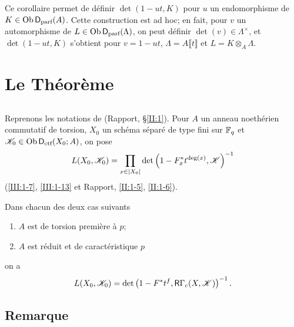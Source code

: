 Ce corollaire permet de définir $\det(1-u t,K)$ pour $u$ un endomorphisme de 
$K\in \operatorname{Ob}\mathsf{D}_\text{parf}(A)$. Cette construction est ad hoc; en fait, pour $v$ un 
automorphisme de $L\in\operatorname{Ob}\mathsf{D}_\text{parf}(\Lambda)$, on peut définir 
$\det(v)\in\Lambda^\times$, et $\det(1-u t,K)$ s'obtient pour $v=1-u t$, 
$\Lambda=A\llbracket t\rrbracket$ et $L=K\otimes_A\Lambda$. 










\section{Le Théorème}\label{III:2}





\subsection{}\label{III:2-1}

Reprenons les notations de (Rapport, \S\ref{II:1}). Pour $A$ un anneau 
noethérien commutatif de torsion, $X_0$ un schéma séparé de type fini sur 
$\mathbb{F}_q$ et $\mathscr{K}_0\in\operatorname{Ob}\mathsf{D}_\text{ctf}(X_0;A)$, on pose 
\[
  L(X_0,\mathscr{K}_0) = \prod_{x\in |X_0|} \det\left(1-F_x^* t^{\deg(x)}, \mathscr{K}\right)^{-1}
\]
(\ref{III:1-7}, \ref{III:1-13} et Rapport, \ref{II:1-5}, \ref{II:1-6}). 





\begin{theorem_}\label{III:2-2}
Dans chacun des deux cas suivants
\begin{enumerate}[\indent a)]
  \item $A$ est de torsion première à $p$;
  \item $A$ est réduit et de caractéristique $p$
\end{enumerate}
on a 
\begin{equation}\label{III:eq:2-2-1}
  L(X_0,\mathscr{K}_0) = \det\left(1-F^* t^f, \mathsf{R}\Gamma_c(X,\mathscr{K})\right)^{-1} \text{.}
\end{equation}
\end{theorem_}





\subsection{Remarque}\label{III:2-3}

